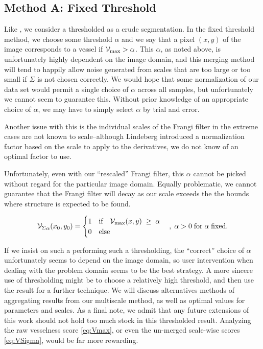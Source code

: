 \subsection{Method A: Fixed Threshold}
Like \cite{huynh2013filter}, we consider a thresholded \Vmax{} as a crude segmentation.
In the fixed threshold method, we choose some threshold $\alpha$ and we say that a pixel $(x,y)$ of the image corresponds to a vessel if
$\mathcal{V}_{\max} >  \alpha$. This $\alpha$, as noted above, is unfortunately highly dependent on the image domain, and this merging method will tend to happily allow noise generated from scales that are too large or too small if $\Sigma$ is not chosen correctly. We would hope that some normalization of our data set would permit a single choice of $\alpha$ across all samples, but unfortunately we cannot seem to guarantee this. Without prior knowledge of an appropriate choice of $\alpha$, we may have to simply select $\alpha$ by trial and error.

 Another issue with this is the individual scales of the Frangi filter in the extreme cases are not known to scale--although Lindeberg introduced a normalization factor based on the scale to apply to the derivatives, we do not know of an optimal factor to use.

Unfortunately, even with our ``rescaled'' Frangi filter, this $\alpha$ cannot be picked without regard for the particular image domain. Equally problematic, we cannot guarantee that the Frangi filter will decay as our scale exceeds the the bounds where structure is expected to be found.


\begin{equation}
{\ensuremath{\mathcal{V}_{\Sigma}}}_{\alpha}(x_0,y_0) = \begin{cases}
1 & \textrm{if}\quad \mathcal{V}_{\max}(x,y) \; \ge\;  \alpha \\
0 & \textrm{else}
\end{cases}  \quad , \; \alpha > 0
\; \textrm{for}\;\alpha\;\textrm{fixed}.
\end{equation}

If we insist on such a performing such a thresholding, the ``correct'' choice of $\alpha$ unfortunately seems to depend on the image domain, so user intervention when dealing with the problem domain seems to be the best strategy. A more sincere use of thresholding might be to choose a relatively high threshold, and then use the result for a further technique.
We will discuss alternatives methods of aggregating results from our multiscale method, as well as optimal values for parameters and scales. As a final note, we admit that any future extensions of this work should not hold too much stock in this thresholded result. Analyzing the raw vesselness score \cref{eq:Vmax}, or even the un-merged scale-wise scores \cref{eq:VSigma}, would be far more rewarding.
 
